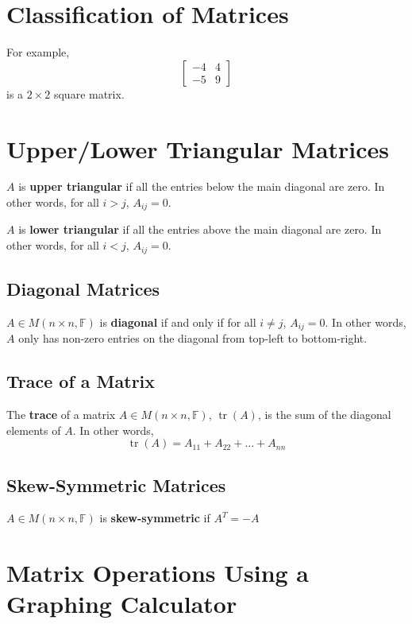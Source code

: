 \documentclass[letterpaper,12pt]{article}
\begin{document}
\section*{Classification of Matrices}


\begin{example}
For example,
\begin{equation*}
    \begin{bmatrix} -4 & 4 \\ -5 & 9 \end{bmatrix}
\end{equation*}
is a $2 \times 2$ square matrix.
\end{example}


\section*{Upper/Lower Triangular Matrices}
\begin{definition}
$A$ is \textbf{upper triangular} if all the entries below the main diagonal are zero. In other words, for all $i > j$, $A_{ij} = 0$.
\end{definition}

\begin{definition}
$A$ is \textbf{lower triangular} if all the entries above the main diagonal are zero. In other words, for all $i < j$, $A_{ij} = 0$.
\end{definition}

\subsection*{Diagonal Matrices}
\begin{definition}
$A \in M(n \times n, \mathbb{F})$ is \textbf{diagonal} if and only if for all $i \neq j$, $A_{ij} = 0$. In other words, $A$ only has non-zero entries on the diagonal from top-left to bottom-right.
\end{definition}

\subsection*{Trace of a Matrix}
\begin{definition}
The \textbf{trace} of a matrix $A \in M(n \times n, \mathbb{F})$, $\operatorname{tr}(A)$, is the sum of the diagonal elements of $A$. In other words,
\begin{equation*}
    \operatorname{tr}(A) = A_{11} + A_{22} + \dots + A_{nn}
\end{equation*}
\end{definition}

\subsection*{Skew-Symmetric Matrices}
\begin{definition}
$A \in M(n \times n, \mathbb{F})$ is \textbf{skew-symmetric} if $A^T = -A$
\end{definition}

\section*{Matrix Operations Using a Graphing Calculator}
\end{document}
